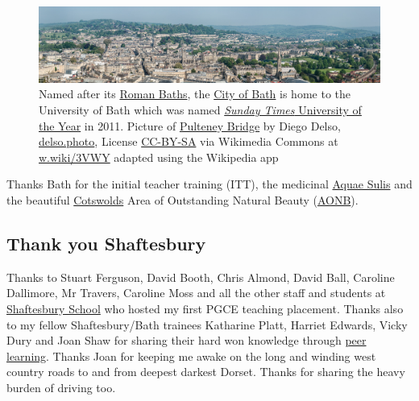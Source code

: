 \documentclass[
]{book}
\begin{document}
\begin{figure}

{\centering \includegraphics[width=1\linewidth]{images/bath-panorama} 

}

\caption{Named after its \href{https://en.wikipedia.org/wiki/Roman_Baths_(Bath)}{Roman Baths}, the \href{https://en.wikipedia.org/wiki/Bath,_Somerset}{City of Bath} is home to the University of Bath which was named \href{https://en.wikipedia.org/wiki/Sunday_Times_University_of_the_Year}{\emph{Sunday Times} University of the Year} in 2011. Picture of \href{https://en.wikipedia.org/wiki/Pulteney_Bridge}{Pulteney Bridge} by Diego Delso, \href{http://delso.photo/}{delso.photo}, License \href{https://creativecommons.org/licenses/by-sa/4.0/legalcode}{CC-BY-SA} via Wikimedia Commons at \href{https://w.wiki/3VWY}{w.wiki/3VWY} adapted using the Wikipedia app}\label{fig:bath-fig}
\end{figure}



Thanks Bath for the initial teacher training (ITT), the medicinal \href{https://en.wikipedia.org/wiki/Aquae_Sulis}{Aquae Sulis} and the beautiful \href{https://en.wikipedia.org/wiki/Cotswolds}{Cotswolds} Area of Outstanding Natural Beauty (\href{https://en.wikipedia.org/wiki/Area_of_Outstanding_Natural_Beauty}{AONB}). 🙏

\hypertarget{shaftesbury}{%
\subsection{Thank you Shaftesbury}\label{shaftesbury}}

Thanks to Stuart Ferguson, David Booth, Chris Almond, David Ball, Caroline Dallimore, Mr Travers, Caroline Moss and all the other staff and students at \href{https://en.wikipedia.org/wiki/Shaftesbury_School}{Shaftesbury School} who hosted my first PGCE teaching placement. Thanks also to my fellow Shaftesbury/Bath trainees Katharine Platt, Harriet Edwards, Vicky Dury and Joan Shaw for sharing their hard won knowledge through \href{https://en.wikipedia.org/wiki/Peer_learning}{peer learning}. Thanks Joan for keeping me awake on the long and winding west country roads to and from deepest darkest Dorset. Thanks for sharing the heavy burden of driving too.
\end{document}
